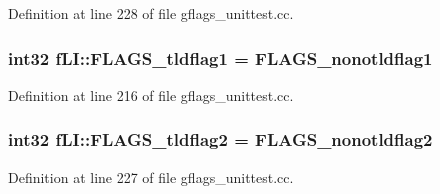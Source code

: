 Definition at line 228 of file gflags\+\_\+unittest.\+cc.

\subsubsection[{\texorpdfstring{F\+L\+A\+G\+S\+\_\+tldflag1}{FLAGS_tldflag1}}]{\setlength{\rightskip}{0pt plus 5cm}int32 f\+L\+I\+::\+F\+L\+A\+G\+S\+\_\+tldflag1 = F\+L\+A\+G\+S\+\_\+nonotldflag1}\hypertarget{namespacefLI_a83bb5fc57fd1c06610c7b745df590fa4}{}\label{namespacefLI_a83bb5fc57fd1c06610c7b745df590fa4}


Definition at line 216 of file gflags\+\_\+unittest.\+cc.

\subsubsection[{\texorpdfstring{F\+L\+A\+G\+S\+\_\+tldflag2}{FLAGS_tldflag2}}]{\setlength{\rightskip}{0pt plus 5cm}int32 f\+L\+I\+::\+F\+L\+A\+G\+S\+\_\+tldflag2 = F\+L\+A\+G\+S\+\_\+nonotldflag2}\hypertarget{namespacefLI_a909cee72f7bff5b476509f7ebc7fc0d7}{}\label{namespacefLI_a909cee72f7bff5b476509f7ebc7fc0d7}


Definition at line 227 of file gflags\+\_\+unittest.\+cc.

